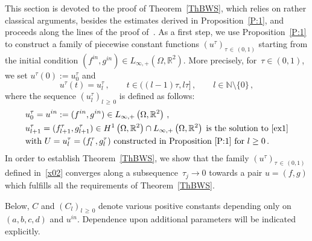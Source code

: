 \documentclass[AHL,Unicode,longabstracts,published]{cedram}
\newcommand{\bbR}{\mathbb{R}}
\newcommand{\bbN}{\mathbb{N}}
\begin{document}
This section is devoted to the proof of Theorem~\ref{ThBWS}, which relies on rather classical arguments, besides the estimates derived in Proposition~\ref{P:1}, and proceeds along the lines of the proof of~\cite[Theorem~1.2]{LM22}. As a first step, we use Proposition~\ref{P:1} to construct a family of piecewise constant functions $(u^\tau)_{\tau\,\in\,(0,1)}$ starting from the initial condition $(f^{in},g^{in})\in L_{\infty,+}(\Omega,\bbR^2)$. More precisely, for~${\tau\in (0,1)}$, we set $u^\tau(0):=u_0^\tau $ and
\begin{equation}\label{x01}
u^\tau(t)= u^\tau_{l}\,, \qquad t\in ((l-1)\tau, l\tau]\,, \qquad l\in\bbN\setminus\{0\}\,,
\end{equation}
where the sequence $(u_{l}^\tau)_{l\,\geq\,0}$ is defined as follows:
\begin{equation}
\begin{split}
&u_0^\tau = u^{in} := (f^{in},g^{in})\in L_{\infty,+}\left(\Omega,\bbR^2\right)\,, \\
&u_{l+1}^\tau =(f_{l+1}^\tau,g_{l+1}^\tau)\in H^1\left(\Omega,\bbR^2\right)\cap L_{\infty,+}\left(\Omega,\bbR^2\right) \;\text{is the solution to~\eqref{ex1}} \\
&\text{with } U=u_l^\tau=(f_l^\tau,g_l^\tau) \text{ constructed in Proposition~\ref{P:1} for }l\ge 0\,.
\end{split}\label{x02}
\end{equation}
In order to establish Theorem~\ref{ThBWS}, we show that the family $(u^\tau)_{\tau\,\in\,(0,1)}$ defined in~\eqref{x02} converges along a subsequence~${\tau_j\to0}$ towards a pair $u=(f,g)$ which fulfills all the requirements of Theorem~\ref{ThBWS}.


Below, $C$ and $(C_l)_{l\,\ge\,0}$ denote various positive constants depending only on~${(a, b, c, d)}$ and $u^{in}$. Dependence upon additional parameters will be indicated explicitly.
\end{document}
